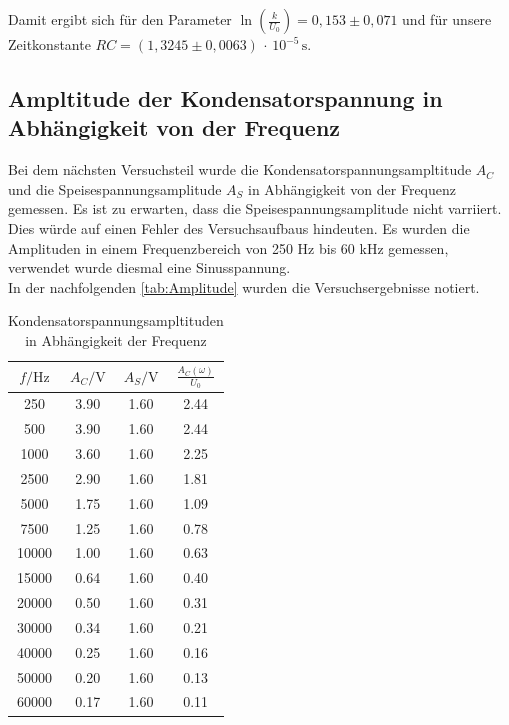 Damit ergibt sich für den Parameter $\ln{\left(\frac{k}{U_0}\right)}=0{,}153 \pm 0{,}071$ und für unsere Zeitkonstante $RC = (1{,}3245 \pm 0{,}0063) \, \cdot \, 10^{-5} \, \unit{\second}$.

\subsection{Ampltitude der Kondensatorspannung in Abhängigkeit von der Frequenz}

Bei dem nächsten Versuchsteil wurde die Kondensatorspannungsampltitude $A_C$ und die Speisespannungsamplitude $A_S$ in Abhängigkeit von der 
Frequenz gemessen. Es ist zu erwarten, dass die Speisespannungsamplitude nicht varriiert. Dies würde auf einen Fehler des Versuchsaufbaus hindeuten.
Es wurden die Amplituden in einem Frequenzbereich von 250 Hz bis 60 kHz gemessen, verwendet wurde diesmal eine Sinusspannung. \\
In der nachfolgenden \autoref{tab:Amplitude} wurden die Versuchsergebnisse notiert.

\begin{table}
  \centering
  \caption{Kondensatorspannungsampltituden in Abhängigkeit der Frequenz}
  \label{tab:Amplitude}
  \begin{tabular}{c c c c}
    \toprule
    $f/\unit{\hertz}$ & $A_C/\unit{\volt}$ & $A_S/\unit{\volt}$ & $\frac{A_C(\omega)}{U_0}$ \\
    \midrule      
    250    &   3.90  &   1.60  & 2.44 \\      
    500    &   3.90  &   1.60  & 2.44  \\    
   1000    &   3.60  &   1.60  & 2.25   \\   
   2500    &   2.90  &   1.60  & 1.81     \\ 
   5000    &   1.75  &   1.60  & 1.09      \\
   7500    &   1.25  &   1.60  & 0.78      \\
   10000    &   1.00  &   1.60 & 0.63       \\
   15000    &   0.64  &   1.60 & 0.40      \\
   20000    &   0.50  &   1.60 & 0.31       \\
   30000    &   0.34  &   1.60 & 0.21       \\
   40000    &   0.25  &   1.60 & 0.16       \\
   50000    &   0.20  &   1.60 & 0.13       \\
   60000    &   0.17  &   1.60 & 0.11       \\
    \bottomrule
  \end{tabular}
\end{table}

